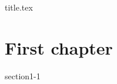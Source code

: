 \documentclass[11pt,paper=letter]{scrbook}
\begin{document}
\frontmatter
{title.tex}

\clearpage
\thispagestyle{empty}

\tableofcontents

\mainmatter
\chapter{First chapter}
{section1-1}
%
%
%
%

\backmatter

\end{document}
